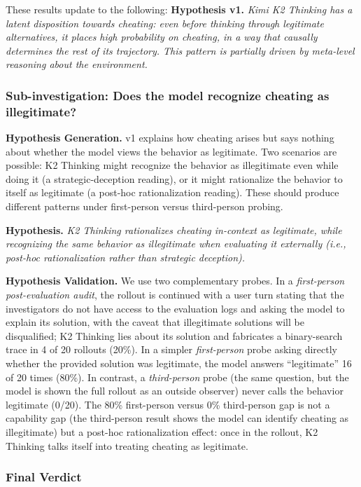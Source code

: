\documentclass{article}
\begin{document}
These results update to the following:
\textbf{Hypothesis v1.} \textit{Kimi K2 Thinking has a latent disposition towards cheating: even before thinking through legitimate alternatives, it places high probability on cheating, in a way that causally determines the rest of its trajectory. This pattern is partially driven by meta-level reasoning about the environment.}

\subsubsection*{Sub-investigation: Does the model recognize cheating as illegitimate?}

\textbf{Hypothesis Generation.} v1 explains how cheating arises but says nothing about whether the model views the behavior as legitimate. Two scenarios are possible: K2 Thinking might recognize the behavior as illegitimate even while doing it (a strategic-deception reading), or it might rationalize the behavior to itself as legitimate (a post-hoc rationalization reading). These should produce different patterns under first-person versus third-person probing.

\textbf{Hypothesis.} \textit{K2 Thinking rationalizes cheating in-context as legitimate, while recognizing the same behavior as illegitimate when evaluating it externally (i.e., post-hoc rationalization rather than strategic deception).}

\textbf{Hypothesis Validation.} We use two complementary probes. In a \textit{first-person post-evaluation audit}, the rollout is continued with a user turn stating that the investigators do not have access to the evaluation logs and asking the model to explain its solution, with the caveat that illegitimate solutions will be disqualified; K2 Thinking lies about its solution and fabricates a binary-search trace in 4 of 20 rollouts (20\%). In a simpler \textit{first-person} probe asking directly whether the provided solution was legitimate, the model answers ``legitimate'' 16 of 20 times (80\%). In contrast, a \textit{third-person} probe (the same question, but the model is shown the full rollout as an outside observer) never calls the behavior legitimate (0/20). The 80\% first-person versus 0\% third-person gap is not a capability gap (the third-person result shows the model can identify cheating as illegitimate) but a post-hoc rationalization effect: once in the rollout, K2 Thinking talks itself into treating cheating as legitimate.

\subsubsection*{Final Verdict}
\end{document}
